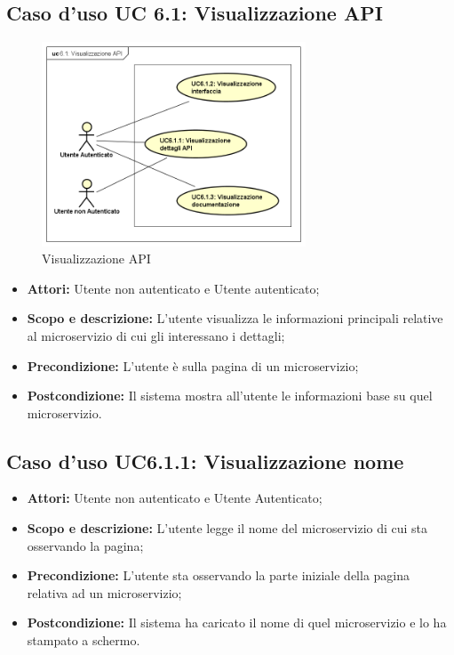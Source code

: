 \documentclass[12pt,a4paper,titlepage]{article}
\begin{document}
\subsection{Caso d'uso UC 6.1: Visualizzazione API}
\begin{figure}[H]
	\centering
	\includegraphics[width=0.7\textwidth]{UseCase/VisualizzazioneAPI}
	\caption{Visualizzazione API}
\end{figure}
\begin{itemize}
	\item \textbf{Attori: }Utente non autenticato e Utente autenticato;
	\item \textbf{Scopo e descrizione: }L'utente visualizza le informazioni principali relative al microservizio di cui gli interessano i dettagli;
	\item \textbf{Precondizione: }L'utente è sulla pagina di un microservizio;
	\item \textbf{Postcondizione: }Il sistema mostra all'utente le informazioni base su quel microservizio.
\end{itemize}
\subsection{Caso d'uso UC6.1.1: Visualizzazione nome}
\begin{itemize}
	\item \textbf{Attori: }Utente non autenticato e Utente Autenticato;
	\item \textbf{Scopo e descrizione: }L'utente legge il nome del microservizio di cui sta osservando la pagina;
	\item \textbf{Precondizione: }L'utente sta osservando la parte iniziale della pagina relativa ad un microservizio;
	\item \textbf{Postcondizione: }Il sistema ha caricato il nome di quel microservizio e lo ha stampato a schermo.
\end{itemize}
\end{document}
